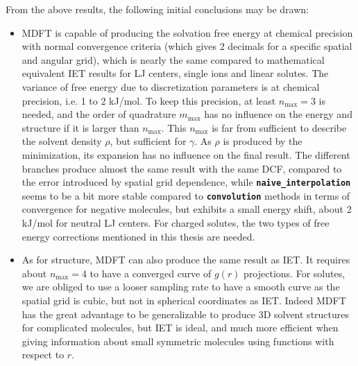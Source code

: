 From the above results, the following initial conclusions may be drawn:
\begin{itemize}
\item \acs{MDFT} is capable of producing the solvation free energy at chemical
precision with normal convergence criteria (which gives 2 decimals
for a specific spatial and angular grid), which is nearly the same
compared to mathematical equivalent \acs{IET} results for LJ centers,
single ions and linear solutes. The variance of free energy due to
discretization parameters is at chemical precision, i.e. 1 to 2 kJ/mol.
To keep this precision, at least $n_{\max}=3$ is needed, and the
order of quadrature $m_{\max}$ has no influence on the energy and
structure if it is larger than $n_{\max}$. This $n_{\max}$ is far
from sufficient to describe the solvent density $\rho$, but sufficient
for $\gamma$. As $\rho$ is produced by the minimization, its expansion
has no influence on the final result. The different branches produce
almost the same result with the same \acs{DCF}, compared to the
error introduced by spatial grid dependence, while \texttt{\textbf{naive\_interpolation}}
seems to be a bit more stable compared to \texttt{\textbf{convolution}}
methods in terms of convergence for negative molecules, but exhibits
a small energy shift, about 2 kJ/mol for neutral LJ centers. For
charged solutes, the two types of free energy corrections mentioned
in this thesis are needed.
\item As for structure, \acs{MDFT} can also produce the same result as
\acs{IET}. It requires about $n_{\max}=4$ to have a converged curve
of $g(r)$ projections. For solutes, we are obliged to use a looser
sampling rate to have a smooth curve as the spatial grid is cubic,
but not in spherical coordinates as \acs{IET}. Indeed \acs{MDFT}
has the great advantage to be generalizable to produce 3D solvent
structures for complicated molecules, but \acs{IET} is ideal, and
much more efficient when giving information about small symmetric molecules
using functions with respect to $r$.
\end{itemize}

